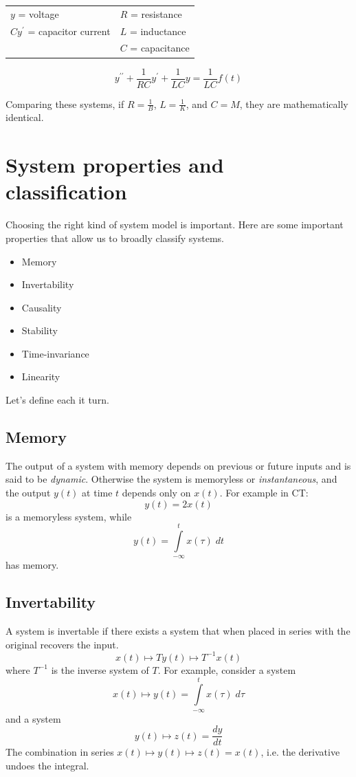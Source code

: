 \begin{tabular}{ll}
  $y$ = voltage & $R$ = resistance\\
  $Cy^\prime$ = capacitor current & $L$ = inductance\\
  & $C$ = capacitance\\
\end{tabular}

\[
y^{\prime\prime} + \frac{1}{RC} y^\prime + \frac{1}{LC}y = \frac{1}{LC}f(t)
\]

Comparing these systems, if $R = \frac{1}{B}$, $L = \frac{1}{K}$, and $C = M$, they are mathematically identical.

\section{System properties and classification}

Choosing the right kind of system model is important. Here are some important properties that allow us to broadly classify systems.
\begin{itemize}
\item Memory
\item Invertability
\item Causality
\item Stability
\item Time-invariance
\item Linearity
\end{itemize}

Let's define each it turn.

\subsection{Memory}
The output of a system with memory depends on previous or future inputs and is said to be {\it dynamic}. Otherwise the system is memoryless or {\it instantaneous}, and the output $y(t)$ at time $t$ depends only on $x(t)$.
For example in CT:
\[
y(t) = 2x(t)
\]
is a memoryless system, while
\[
y(t) = \int\limits_{-\infty}^{t} x(\tau) \; dt
\]
has memory.

\subsection{Invertability}

A system is invertable if there exists a system that when placed in series with the original recovers the input.
\[
x(t) \mapsto{T} y(t) \mapsto{T^{-1}} x(t)
\]
where $T^{-1}$ is the inverse system of $T$. For example, consider a system
\[
x(t) \mapsto y(t) = \int\limits_{-\infty}^t x(\tau) \; d\tau
\]
and a system
\[
y(t) \mapsto z(t) = \frac{dy}{dt} 
\]
The combination in series $x(t) \mapsto y(t) \mapsto z(t) = x(t)$, i.e. the derivative undoes the integral.

